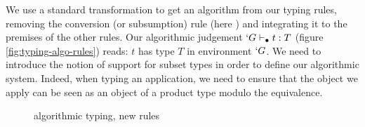 \documentclass{llncs}
\begin{document}
\begin{paragraph}{}
We use a standard transformation to get an algorithm from our typing
rules, removing the conversion (or subsumption) rule
(here ) and integrating it to the premises of the other rules.
Our algorithmic judgement $`G \vdash_{\bullet} t : T$
(figure \vref{fig:typing-algo-rules})
reads: $t$ has type $T$ in environment $`G$.
We need to introduce the notion of support for subset types in order to
define our algorithmic system. Indeed, when typing an application, 
we need to ensure that the object we apply can be seen as an object of a
product type modulo the equivalence. 
\begin{figure*}[t]
  \def\infvspace{0.5em}
    \def\type{\typea}
    \def\subt{\subta}
    \def\sub{\suba}
    \def\fCenter{\typea}
    \begin{center}
    
    
    
    


    \vspace{\infvspace}
    \AppA\DP

    
    \vspace{\infvspace}
    \SumDepA\DP

    \vspace{\infvspace}
    \PiLeftA\DP
    \quad\hspace{-2.5em}
    \PiRightA\DP

  \end{center}
  \vspace{-1em}
  \caption{\Russell{} algorithmic typing, new rules}
  \label{fig:typing-algo-rules}
\end{figure*}


\end{paragraph}
\end{document}
